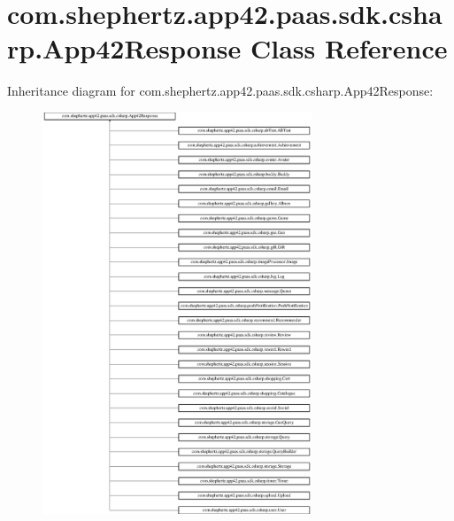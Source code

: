 \hypertarget{classcom_1_1shephertz_1_1app42_1_1paas_1_1sdk_1_1csharp_1_1_app42_response}{\section{com.\+shephertz.\+app42.\+paas.\+sdk.\+csharp.\+App42\+Response Class Reference}
\label{classcom_1_1shephertz_1_1app42_1_1paas_1_1sdk_1_1csharp_1_1_app42_response}
}
Inheritance diagram for com.\+shephertz.\+app42.\+paas.\+sdk.\+csharp.\+App42\+Response\+:\begin{figure}[H]
\begin{center}
\leavevmode
\includegraphics[height=12.000000cm]{classcom_1_1shephertz_1_1app42_1_1paas_1_1sdk_1_1csharp_1_1_app42_response}
\end{center}
\end{figure}
